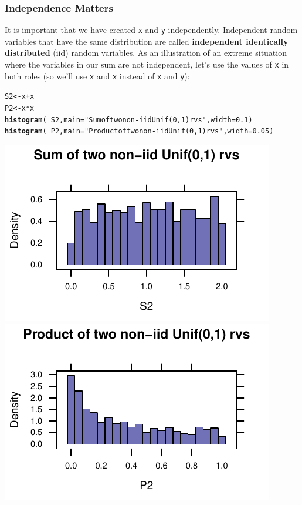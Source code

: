\documentclass[twoside]{book}\usepackage[]{graphicx}\usepackage[]{xcolor}
\makeatletter
\def\maxwidth{ %
  \ifdim\Gin@nat@width>\linewidth
    \linewidth
  \else
    \Gin@nat@width
  \fi
}
\newcommand{\hlnum}[1]{\textcolor[rgb]{0.686,0.059,0.569}{#1}}%
\newcommand{\hlstr}[1]{\textcolor[rgb]{0.192,0.494,0.8}{#1}}%
\newcommand{\hlopt}[1]{\textcolor[rgb]{0,0,0}{#1}}%
\newcommand{\hlstd}[1]{\textcolor[rgb]{0.345,0.345,0.345}{#1}}%
\newcommand{\hlkwb}[1]{\textcolor[rgb]{0.69,0.353,0.396}{#1}}%
\newcommand{\hlkwc}[1]{\textcolor[rgb]{0.333,0.667,0.333}{#1}}%
\newcommand{\hlkwd}[1]{\textcolor[rgb]{0.737,0.353,0.396}{\textbf{#1}}}%
\newenvironment{kframe}{%
 \def\at@end@of@kframe{}%
 \ifinner\ifhmode%
  \def\at@end@of@kframe{\end{minipage}}%
  \begin{minipage}{\columnwidth}%
 \fi\fi%
 \def\FrameCommand##1{\hskip\@totalleftmargin \hskip-\fboxsep
 \colorbox{shadecolor}{##1}\hskip-\fboxsep
     \hskip-\linewidth \hskip-\@totalleftmargin \hskip\columnwidth}%
 \MakeFramed {\advance\hsize-\width
   \@totalleftmargin\z@ \linewidth\hsize
   \@setminipage}}%
 {\par\unskip\endMakeFramed%
 \at@end@of@kframe}
\newenvironment{knitrout}{}{} %
\def\term#1{\textbf{#1}}
\makeatother
\begin{document}
\subsubsection*{Independence Matters}
It is important that we have created \texttt{x} and \texttt{y} independently.
Independent random variables that have the same distribution are called 
\term{independent identically distributed} (iid) random variables.  As an illustration
of an extreme situation where the variables in our sum are not independent, let's 
use the values of \texttt{x} in both roles (so we'll use \texttt{x} and \texttt{x} instead of \texttt{x} and \texttt{y}):

\begin{knitrout}
\color{fgcolor}\begin{kframe}
\begin{alltt}
\hlstd{S2} \hlkwb{<-} \hlstd{x} \hlopt{+} \hlstd{x}
\hlstd{P2} \hlkwb{<-} \hlstd{x} \hlopt{*} \hlstd{x}
\hlkwd{histogram}\hlstd{(} \hlopt{~} \hlstd{S2 ,} \hlkwc{main}\hlstd{=}\hlstr{"Sum of two non-iid Unif(0,1) rvs"}\hlstd{,} \hlkwc{width}\hlstd{=}\hlnum{0.1}\hlstd{)}
\hlkwd{histogram}\hlstd{(} \hlopt{~} \hlstd{P2 ,} \hlkwc{main}\hlstd{=}\hlstr{"Product of two non-iid Unif(0,1) rvs"}\hlstd{,} \hlkwc{width}\hlstd{=}\hlnum{0.05}\hlstd{)}
\end{alltt}
\end{kframe}

{\centering \includegraphics[width=\maxwidth]{figures/fig-sum-product-uniform-non-iid-1} 
\includegraphics[width=\maxwidth]{figures/fig-sum-product-uniform-non-iid-2} 

}



\end{knitrout}
\end{document}
